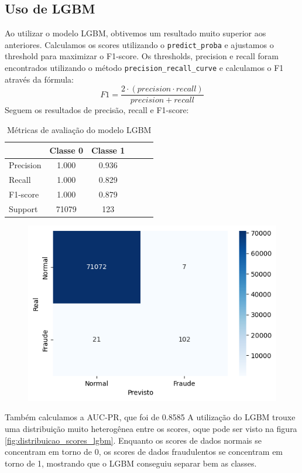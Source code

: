 \documentclass[conference]{IEEEtran}
\begin{document}
\subsection{Uso de LGBM}
\label{subsec:validacao}
Ao utilizar o modelo LGBM, obtivemos um resultado muito superior aos anteriores. Calculamos os scores utilizando o \texttt{predict\_proba} e ajustamos o threshold para maximizar o F1-score. Os thresholds, precision e recall foram encontrados utilizando o método \texttt{precision\_recall\_curve} e calculamos o F1 através da fórmula:
\begin{equation}
    F1 = \frac{2 \cdot (precision \cdot recall)}{precision + recall}
\end{equation}
Seguem os resultados de precisão, recall e F1-score:
\begin{table}[tb]
    \caption{Métricas de avaliação do modelo LGBM}
    \label{tab:metricas_lgbm}
    \centering
    \begin{tabular}{lccccc}
        \toprule
        & \textbf{Classe 0} & \textbf{Classe 1} \\
        \midrule
        Precision  & 1.000 & 0.936 \\
        Recall     & 1.000 & 0.829 \\
        F1-score   & 1.000 & 0.879 \\
        Support    & 71079 & 123   \\
        \bottomrule
    \end{tabular}
\end{table}
  \begin{figure}[H]
    \centerline{\includegraphics[width=0.8\linewidth]{../output/matriz confusao lgbm.png}}
    \label{fig:matriz_confusao_lgbm}
  \end{figure}
Também calculamos a AUC-PR, que foi de 0.8585
A utilização do LGBM trouxe uma distribuição muito heterogênea entre os scores, oque pode ser visto na figura \ref{fig:distribuicao_scores_lgbm}. Enquanto os scores de dados normais se concentram em torno de 0, os scores de dados fraudulentos se concentram em torno de 1, mostrando que o LGBM conseguiu separar bem as classes.
\end{document}
